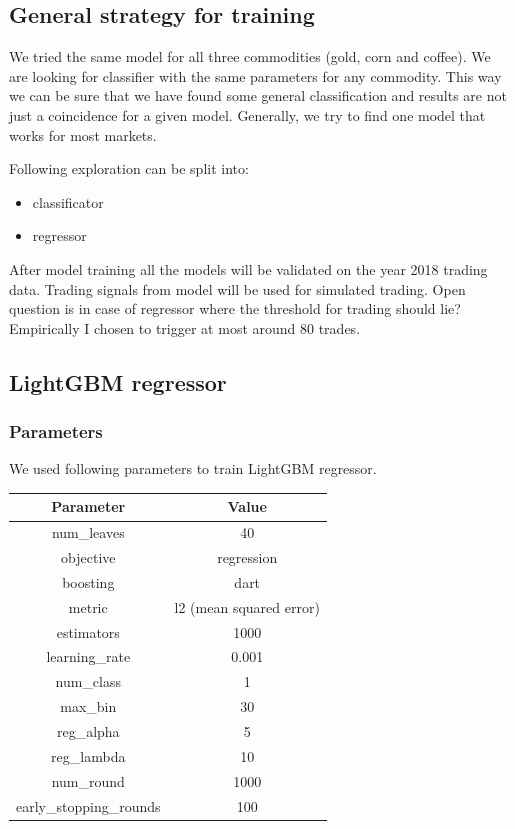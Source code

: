 \documentclass[final,2p]{elsarticle}
\begin{document}
\subsection{General strategy for training}
We tried the same model for all three commodities (gold, corn and coffee). We are looking for classifier with the same parameters for any commodity. This way we can be sure that we have found some general classification and results are not just a coincidence for a given model.
Generally, we try to find one model that works for most markets.

Following exploration can be split into:

\begin{itemize}
    \item classificator
    \item regressor
\end{itemize}

After model training all the models will be validated on the year 2018 trading data. Trading signals from model will be used for simulated trading. Open question is in case of regressor where the threshold for trading should lie?
Empirically I chosen to trigger at most around $80$ trades.

\subsection{LightGBM regressor}

\subsubsection{Parameters}
We used following parameters to train LightGBM regressor. 

\begin{center}
\begin{tabular}{cc}
    Parameter & Value \\
    \hline
    num\_leaves & 40 \\
    objective & regression \\
    boosting & dart \\
    metric & l2 (mean squared error) \\
    estimators & 1000 \\
    learning\_rate & 0.001 \\
    num\_class & 1 \\
    max\_bin & 30 \\
    reg\_alpha & 5 \\
    reg\_lambda & 10 \\
    num\_round & 1000 \\
    early\_stopping\_rounds & 100 \\
\end{tabular}
\end{center}
\end{document}
